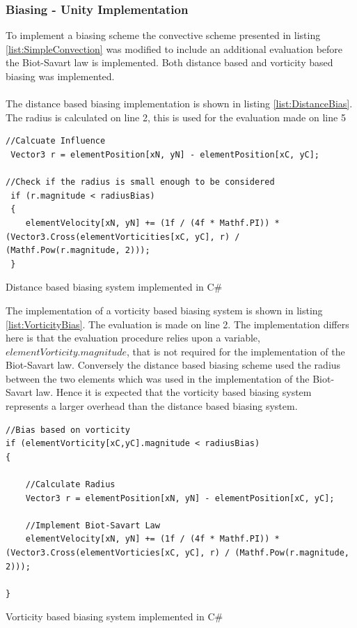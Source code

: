 \subsubsection{Biasing - Unity Implementation}
To implement a biasing scheme the convective scheme presented in listing \ref{list:SimpleConvection} was modified to include an additional evaluation before the Biot-Savart law is implemented. Both distance based and vorticity based biasing was implemented.
\\\\
The distance based biasing implementation is shown in listing \ref{list:DistanceBias}. The radius is calculated on line 2, this is used for the evaluation made on line 5

\begin{listing}[H]
\begin{verbatim}
//Calcuate Influence
 Vector3 r = elementPosition[xN, yN] - elementPosition[xC, yC];

//Check if the radius is small enough to be considered
 if (r.magnitude < radiusBias)
 {
    elementVelocity[xN, yN] += (1f / (4f * Mathf.PI)) * (Vector3.Cross(elementVorticities[xC, yC], r) / (Mathf.Pow(r.magnitude, 2)));
 }
\end{verbatim}
\caption{Distance based biasing system implemented in C\#}
\label{list:DistanceBias}
\end{listing}

The implementation of a vorticity based biasing system is shown in listing \ref{list:VorticityBias}. The evaluation is made on line 2. The implementation differs here is that the evaluation procedure relies upon a variable, $elementVorticity.magnitude$, that is not required for the implementation of the Biot-Savart law. Conversely the distance based biasing scheme used the radius between the two elements which was used in the implementation of the Biot-Savart law. Hence it is expected that the vorticity based biasing system represents a larger overhead than the distance based biasing system.

\begin{listing}[H]
\begin{verbatim}
//Bias based on vorticity
if (elementVorticity[xC,yC].magnitude < radiusBias)
{

	//Calculate Radius
	Vector3 r = elementPosition[xN, yN] - elementPosition[xC, yC];
                                
	//Implement Biot-Savart Law
	elementVelocity[xN, yN] += (1f / (4f * Mathf.PI)) * (Vector3.Cross(elementVorticies[xC, yC], r) / (Mathf.Pow(r.magnitude, 2)));

}
\end{verbatim}
\caption{Vorticity based biasing system implemented in C\#}
\label{list:VorticityBias}
\end{listing}

